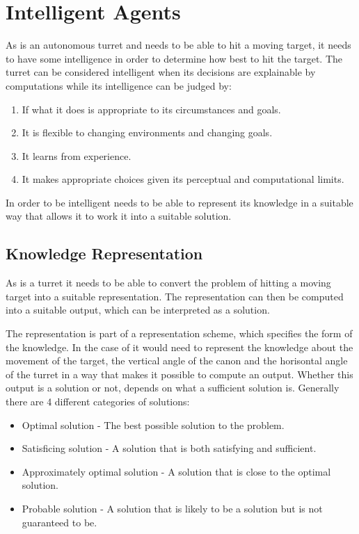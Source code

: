 \section{Intelligent Agents}

As \name is an autonomous turret and needs to be able to hit a moving target,
it needs to have some intelligence in order to determine how best to hit the
target. The turret can be considered intelligent when its decisions
are explainable by computations while its intelligence can be judged by:

\begin{enumerate}
  \item If what it does is appropriate to its circumstances and goals.
  \item It is flexible to changing environments and changing goals.
  \item It learns from experience.
  \item It makes appropriate choices given its perceptual and computational
  limits.
\end{enumerate}

In order to be intelligent \name needs to be able to represent its knowledge in
a suitable way that allows it to work it into a suitable solution.

\subsection{Knowledge Representation}\label{KR}

As \name is a turret it needs to be able to convert the problem of hitting a
moving target into a suitable representation. The representation can then be
computed into a suitable output, which can be interpreted as a solution.


The representation is part of a representation scheme, which specifies the form
of the knowledge. In the case of \name it would need to represent the knowledge
about the movement of the target, the vertical angle of the canon and the
horisontal angle of the turret in a way that makes it possible to compute an
output. Whether this output is a solution or not, depends on what a sufficient
solution is. Generally there are 4 different categories of solutions:

\begin{itemize}
  \item Optimal solution - The best possible solution to the problem.
  \item Satisficing solution - A solution that is both satisfying and
  sufficient.
  \item Approximately optimal solution - A solution that is close to the optimal
  solution.
  \item Probable solution - A solution that is likely to be a solution but is
  not guaranteed to be.
\end{itemize}

